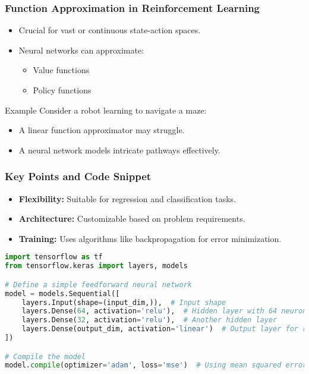 \documentclass[aspectratio=169]{beamer}
\begin{document}
\begin{frame}[fragile]
    \frametitle{Function Approximation in Reinforcement Learning}
    \begin{itemize}
        \item Crucial for vast or continuous state-action spaces.
        \item Neural networks can approximate:
            \begin{itemize}
                \item Value functions
                \item Policy functions
            \end{itemize}
    \end{itemize}
    
    \begin{block}{Example}
        Consider a robot learning to navigate a maze:
        \begin{itemize}
            \item A linear function approximator may struggle.
            \item A neural network models intricate pathways effectively.
        \end{itemize}
    \end{block}
\end{frame}

\begin{frame}[fragile]
    \frametitle{Key Points and Code Snippet}
    \begin{itemize}
        \item \textbf{Flexibility:} Suitable for regression and classification tasks.
        \item \textbf{Architecture:} Customizable based on problem requirements.
        \item \textbf{Training:} Uses algorithms like backpropagation for error minimization.
    \end{itemize}

    \begin{lstlisting}[language=Python]
import tensorflow as tf
from tensorflow.keras import layers, models

# Define a simple feedforward neural network
model = models.Sequential([
    layers.Input(shape=(input_dim,)),  # Input shape
    layers.Dense(64, activation='relu'),  # Hidden layer with 64 neurons
    layers.Dense(32, activation='relu'),  # Another hidden layer
    layers.Dense(output_dim, activation='linear')  # Output layer for regression
])

# Compile the model
model.compile(optimizer='adam', loss='mse')  # Using mean squared error
    \end{lstlisting}
\end{frame}
\end{document}
